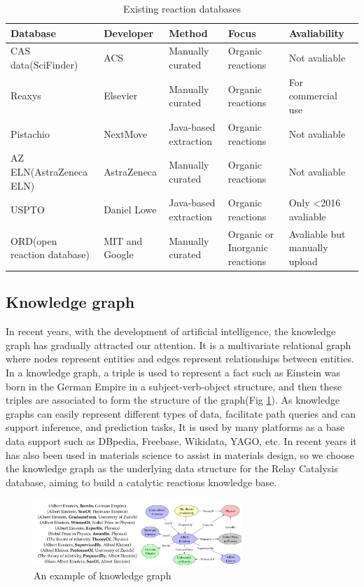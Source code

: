 \documentclass[%
 aip,
 jmp,%
 amsmath,amssymb,
 reprint,%
]{revtex4-2}
\begin{document}
\begin{table}[h!]
\begin{tabular}{ |p{3cm}|p{3cm}|p{3cm}|p{3cm}|p{3cm}|  }
\hline
Database&Developer&Method&Focus&Avaliability\\ \hline
CAS data(SciFinder)& ACS    &Manually curated&   Organic reactions&Not avaliable\\ \hline
Reaxys&   Elsevier  & Manually curated   &Organic reactions&For commercial use\\ \hline
Pistachio & NextMove & Java-based extraction &  Organic reactions&Not avaliable\\ \hline
AZ ELN(AstraZeneca ELN)    &AstraZeneca & Manually curated&  Organic reactions&Not avaliable\\ \hline
USPTO&   Daniel Lowe  & Java-based extraction&Organic reactions&Only <2016 avaliable\\ \hline
ORD(open reaction database) & MIT and Google  & Manually curated   &Organic or Inorganic reactions&Avaliable but manually upload\\ \hline
\end{tabular}
\caption{Existing reaction databases}
\label{table.1}
\end{table}

\subsection{Knowledge graph}

In recent years, with the development of artificial intelligence, the knowledge graph has gradually 
attracted our attention. It is a multivariate relational graph where nodes represent entities and 
edges represent relationships between entities. In a knowledge graph, a triple is used to represent a 
fact such as Einstein was born in the German Empire in a subject-verb-object structure, and then 
these triples are associated to form the structure of the graph(Fig \ref{ Fig.2 }).
As knowledge graphs can easily represent different types of data, facilitate path queries and can support inference, 
and prediction tasks, It is used by many platforms as a base data support such as DBpedia, Freebase, Wikidata,
YAGO, etc. In recent years it has also been used in materials science to assist in materials design, 
so we choose the knowledge graph as the underlying data structure for the Relay Catalysis database, aiming to build a catalytic reactions knowledge base.

\begin{figure}[htbp]
 \centering
 \includegraphics[width=0.7\textwidth]{figure/2.png}
 \caption{ An example of knowledge graph }
 \label{ Fig.2 }
\end{figure}
\end{document}
